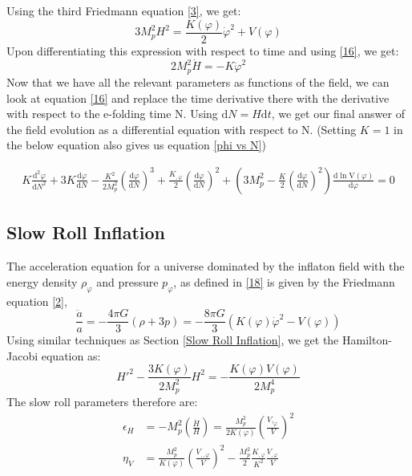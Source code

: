 \documentclass[aps,prd,reprint,preprintnumbers,showpacs,floatfix,nofootinbib,superscript address]{revtex4-2}
\begin{document}
Using the third Friedmann equation \ref{3}, we get:
\begin{equation}    \label{19}
    3 M_p^2H^2 = \frac{K(\varphi)}{2} \dot{\varphi}^2 + V(\varphi)
\end{equation}
Upon differentiating this expression with respect to time and using \ref{16}, we get:
\begin{equation} \label{20}
    2 M_p^2 \dot{H} = -  K \dot{\varphi}^2
\end{equation}
Now that we have all the relevant parameters as functions of the field, we can look at equation \ref{16} and replace the time derivative there with the derivative with respect to the e-folding time N. Using $\text{d}N = H \text{d}t$, we get our final answer of the field evolution as a differential equation with respect to N. (Setting $K = 1$ in the below equation also gives us equation \ref{phi vs N})
\begin{widetext}
\begin{subequations}
\begin{align}\label{Kphi vs N}
    K\frac{\text{d}^2\varphi}{\text{d}N^2} +3 K \frac{\text{d}\varphi}{\text{d}N}  - \frac{K^2}{2M_p^2} \left(\frac{\text{d}\varphi}{\text{d}N} \right)^3  +  \frac{K_{,\varphi}}{2}  \left(\frac{\text{d}\varphi}{\text{d}N} \right)^2 +  \left( 3 M_p^2 - \frac{K}{2} \left(\frac{\text{d}\varphi}{\text{d}N} \right)^2 \right) \frac{\text{d}\ln \text{V}(\varphi)}{\text{d} \varphi} = 0    
\end{align}
\end{subequations}
\end{widetext}
\subsection{Slow Roll Inflation}
The acceleration equation for a universe dominated by the inflaton field with the energy density $\rho_{\varphi}$ and pressure $p_{\varphi}$, as defined in \ref{18} is given by the Friedmann equation \ref{2},
\begin{equation}
    \frac{\ddot{a}}{a} = -\frac{4\pi G}{3} (\rho +3p) = -\frac{8\pi G}{3} (K(\varphi){\dot{\varphi}}^2 - V(\varphi)) 
\end{equation}
Using similar techniques as Section \ref{Slow Roll Inflation}, we get the Hamilton-Jacobi equation as: 
\begin{equation}    \label{KHJ}
    H'^2 - \frac{3K(\varphi)}{2M_p^2}H^2 = - \frac{K(\varphi) V(\varphi)}{2M_p^4} 
\end{equation}
The slow roll parameters therefore are:
\begin{align}
    \epsilon_H &= - M_p^2 \left(\frac{\dot{H}}{H} \right) = \frac{M_p^2}{2 K(\varphi)} \left(\frac{V,_\varphi}{V}\right)^2 \\
    \eta_V &= \frac{M_p^2}{K(\varphi)} \left( \frac{V_{,,\varphi}}{V} \right)^2 - \frac{M_p^2}{2} \frac{K_{,\varphi}}{K^2} \frac{V_{,\varphi}}{V}
\end{align}

\newpage
\,
\newpage
\printbibliography
\end{document}
